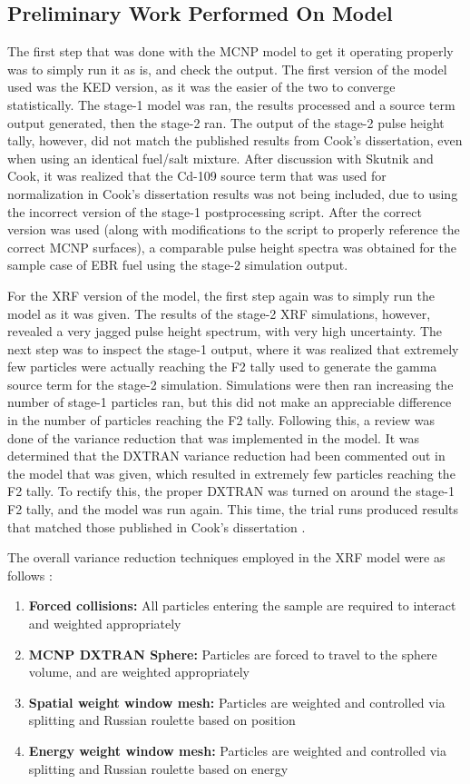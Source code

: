 \subsection{Preliminary Work Performed On Model}

The first step that was done with the MCNP model to get it operating properly was to simply run it as is, and check the output. The first version of the model used was the KED version, as it was the easier of the two to converge statistically. The stage-1 model was ran, the results processed and a source term output generated, then the stage-2 ran. The output of the stage-2 pulse height tally, however, did not match the published results from Cook's dissertation, even when using an identical fuel/salt mixture. After discussion with Skutnik and Cook, it was realized that the Cd-109 source term that was used for normalization in Cook's dissertation results was not being included, due to using the incorrect version of the stage-1 postprocessing script. After the correct version was used (along with modifications to the script to properly reference the correct MCNP surfaces), a comparable pulse height spectra was obtained for the sample case of EBR fuel using the stage-2 simulation output. 

For the XRF version of the model, the first step again was to simply run the model as it was given. The results of the stage-2 XRF simulations, however, revealed a very jagged pulse height spectrum, with very high uncertainty. The next step was to inspect the stage-1 output, where it was realized that extremely few particles were actually reaching the F2 tally used to generate the gamma source term for the stage-2 simulation. Simulations were then ran increasing the number of stage-1 particles ran, but this did not make an appreciable difference in the number of particles reaching the F2 tally. Following this, a review was done of the variance reduction that was implemented in the model. It was determined that the DXTRAN variance reduction had been commented out in the model that was given, which resulted in extremely few particles reaching the F2 tally. To rectify this, the proper DXTRAN was turned on around the stage-1 F2 tally, and the model was run again. This time, the trial runs produced results that matched those published in Cook's dissertation \cite{Cook2015}. 

The overall variance reduction techniques employed in the XRF model were as follows \cite{Cook2015}:
%
\begin{enumerate}
\item \textbf{Forced collisions:} All particles entering the sample are required to interact and weighted appropriately
\item \textbf{MCNP DXTRAN Sphere:} Particles are forced to travel to the sphere volume, and are weighted appropriately
\item \textbf{Spatial weight window mesh:} Particles are weighted and controlled via splitting and Russian roulette based on position
\item \textbf{Energy weight window mesh:} Particles are weighted and controlled via splitting and Russian roulette based on energy
\end{enumerate}
%

